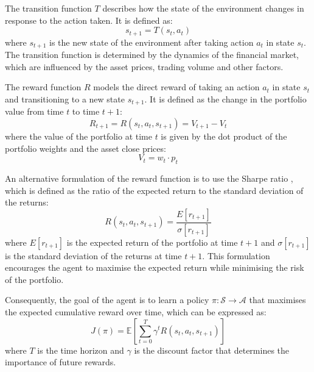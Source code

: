The transition function $T$ describes how the state of the environment changes in response to the action taken. It is defined as:
\begin{equation}
    s_{t+1} = T(s_t, a_t)
\end{equation}
where $s_{t+1}$ is the new state of the environment after taking action $a_t$ in state $s_t$. The transition function is determined by the dynamics of the financial market, which are influenced by the asset prices, trading volume and other factors.

The reward function $R$ models the direct reward of taking an action $a_t$ in state $s_t$ and transitioning to a new state $s_{t+1}$. It is defined as the change in the portfolio value from time $t$ to time $t+1$:
\begin{equation}
    R_{t+1} = R(s_t, a_t, s_{t+1}) = V_{t+1} - V_t
\end{equation}
where the value of the portfolio at time $t$ is given by the dot product of the portfolio weights and the asset close prices:
\begin{equation}
    V_t = w_t \cdot p_t
\end{equation}

An alternative formulation of the reward function is to use the Sharpe ratio \cite{Sharpe1994}, which is defined as the ratio of the expected return to the standard deviation of the returns:
\begin{equation}
    R(s_t, a_t, s_{t+1}) = \frac{E[r_{t+1}]}{\sigma[r_{t+1}]}
\end{equation}
where $E[r_{t+1}]$ is the expected return of the portfolio at time $t+1$ and $\sigma[r_{t+1}]$ is the standard deviation of the returns at time $t+1$. This formulation encourages the agent to maximise the expected return while minimising the risk of the portfolio.

Consequently, the goal of the agent is to learn a policy $\pi: \mathcal{S} \to \mathcal{A}$ that maximises the expected cumulative reward over time, which can be expressed as:
\begin{equation}
    J(\pi) = \mathbb{E} \left[\sum_{t=0}^{T} \gamma^t R(s_t, a_t, s_{t+1}) \right]
\end{equation} 
where $T$ is the time horizon and $\gamma$ is the discount factor that determines the importance of future rewards. 

